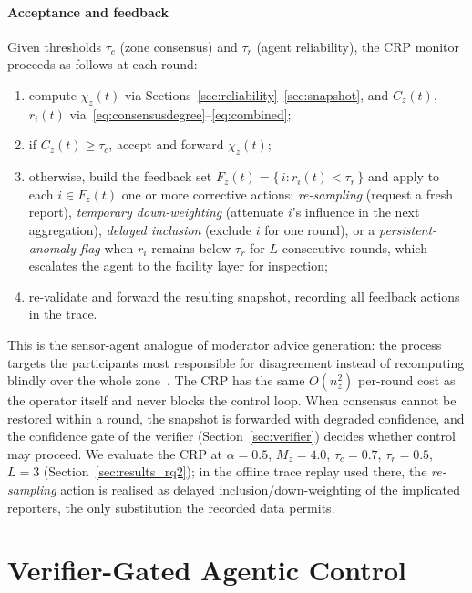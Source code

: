 \documentclass[smartcities,article,submit,moreauthors]{Definitions/mdpi}
\begin{document}
\paragraph{Acceptance and feedback}
Given thresholds $\tau_c$ (zone consensus) and $\tau_r$ (agent
reliability), the CRP monitor proceeds as follows at each round:
\begin{enumerate}
\item compute $\chi_z(t)$ via
Sections~\ref{sec:reliability}--\ref{sec:snapshot}, and
$C_z(t)$, $r_i(t)$ via~\eqref{eq:consensusdegree}--\eqref{eq:combined};
\item if $C_z(t)\geq\tau_c$, accept and forward $\chi_z(t)$;
\item otherwise, build the feedback set
$F_z(t)=\{\,i : r_i(t)<\tau_r\,\}$ and apply to each $i\in F_z(t)$ one
or more corrective actions:
\emph{re-sampling} (request a fresh report),
\emph{temporary down-weighting} (attenuate $i$'s influence in the next
aggregation),
\emph{delayed inclusion} (exclude $i$ for one round), or a
\emph{persistent-anomaly flag} when $r_i$ remains below $\tau_r$ for
$L$ consecutive rounds, which escalates the agent to the facility layer
for inspection;
\item re-validate and forward the resulting snapshot, recording all
feedback actions in the trace.
\end{enumerate}
This is the sensor-agent analogue of moderator advice generation: the
process targets the participants most responsible for disagreement
instead of recomputing blindly over the whole
zone~\cite{cabrerizo2009,cabrerizo2010kbs}. The CRP has the same
$O(n_z^2)$ per-round cost as the operator itself and never blocks the
control loop. When consensus cannot be restored within a round, the
snapshot is forwarded with degraded confidence, and the confidence gate
of the verifier (Section~\ref{sec:verifier}) decides whether control may
proceed. We evaluate the CRP at $\alpha=0.5$, $M_z=4.0$,
$\tau_c=0.7$, $\tau_r=0.5$, $L=3$ (Section~\ref{sec:results_rq2}); in the
offline trace replay used there, the \emph{re-sampling} action is realised
as delayed inclusion/down-weighting of the implicated reporters, the only
substitution the recorded data permits.

\section{Verifier-Gated Agentic Control}
\label{sec:agentic}
\end{document}
